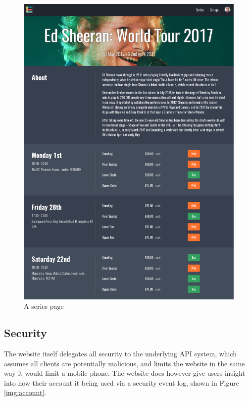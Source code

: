 \documentclass[12pt,a4paper]{bhamdissertation}
\begin{document}
\begin{figure}[!htbp]
    \centering
    \includegraphics[width=1\linewidth]{img/series.png}
    \caption{A series page}
    \label{img:series}
    \vspace{-1cm}
\end{figure}

\subsection{Security}

The website itself delegates all security to the underlying API system, which assumes all clients are potentially malicious, and limits the website in the same way it would limit a mobile phone. The website does however give users insight into how their account it being used via a security event log, shown in Figure \ref{img:account}.
\end{document}
